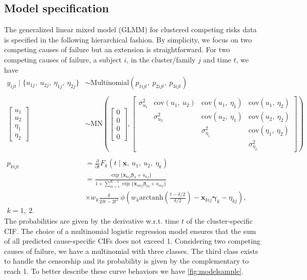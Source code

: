 \documentclass[a4paper,12pt]{article}
\begin{document}
\subsection{Model specification}
\label{multiGLMM}

The generalized linear mixed model (GLMM) for clustered competing risks
data is specified in the following hierarchical fashion. By simplicity,
we focus on two competing causes of failure but an extension is
straightforward. For two competing causes of failure, a subject \(i\),
in the cluster/family \(j\) and time \(t\), we have
\begin{align}
 y_{i j t} \mid \{u_{1j},~u_{2j},~\eta_{1j},~\eta_{2j}\}
 &\sim\text{Multinomial}(p_{1ijt},~p_{2ijt},~p_{3ijt})\nonumber\\
 \nonumber\\
 \begin{bmatrix} u_{1}\\u_{2}\\\eta_{1}\\\eta_{2} \end{bmatrix}
 &\sim\text{MN}
  \left(
   \begin{bmatrix} 0\\0\\0\\0 \end{bmatrix},
   \begin{bmatrix}
    \sigma_{u_{1}}^{2}&
    \text{cov}(u_{1},~u_{2})&
    \text{cov}(u_{1},~\eta_{1})&\text{cov}(u_{1},~\eta_{2})\\
    &\sigma_{u_{2}}^{2}&
    \text{cov}(u_{2},~\eta_{1})&\text{cov}(u_{2},~\eta_{2})\\
    &&\sigma_{\eta_{1}}^{2}&\text{cov}(\eta_{1},~\eta_{2})\\
    &&&\sigma_{\eta_{2}}^{2}
   \end{bmatrix}
  \right)\nonumber\\
 \nonumber\\
 p_{kijt}
 &=\frac{\partial}{\partial t}
  F_{k} (t \mid \bm{x},~u_{1},~u_{2},~\eta_{k})\label{eq:model}\\
 &= \frac{\exp\{\bm{x}_{kij}\bm{\beta}_{k} + u_{kj}\}}{
    1 + \sum_{m=1}^{K-1}\exp\{\bm{x}_{mij}\bm{\beta}_{m} + u_{mj}\}}
  \nonumber\\
 &\times w_{k}\frac{\delta}{2\delta t - 2t^{2}}~
  \phi\left(
   w_{k}
   \text{arctanh}\left(\frac{t-\delta/2}{\delta/2}\right)
   - \bm{x}_{kij}\bm{\gamma}_{k} - \eta_{kj}
  \right),\nonumber\\k = 1,~2.\nonumber
\end{align}
The probabilities are given by the derivative w.r.t. time \(t\) of the
cluster-specific CIF. The choice of a multinomial logistic regression
model ensures that the sum of all predicted cause-specific CIFs does not
exceed 1. Considering two competing causes of failure, we have a
multinomial with three classes. The third class exists to handle the
censorship and its probability is given by the complementary to reach
1. To better describe these curve behaviors we have
\autoref{fig:modelsample}.
\end{document}
